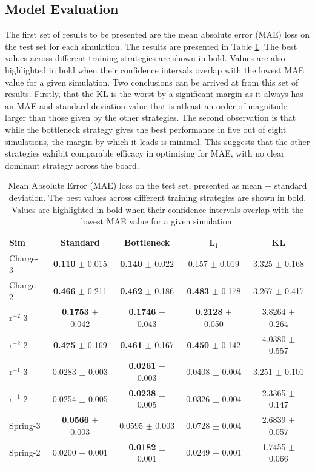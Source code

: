 \documentclass[11pt]{article}
\begin{document}
\subsection{Model Evaluation}
The first set of results to be presented are the mean absolute error (MAE) loss on the test set for each simulation. The results are presented in Table \ref{tab:mae_table_with_std}. The best values across different training strategies are shown in bold. Values are also highlighted in bold when their confidence intervals overlap with the lowest MAE value for a given simulation. Two conclusions can be arrived at from this set of results. Firstly, that the KL is the worst by a significant margin as it always has an MAE and standard deviation value that is atleast an order of magnitude larger than those given by the other strategies. The second observation is that while the bottleneck strategy gives the best performance in five out of eight simulations, the margin by which it leads is minimal. This suggests that the other strategies exhibit comparable efficacy in optimising for MAE, with no clear dominant strategy across the board.
\begin{table}[H]
    \centering
    \begin{tabular}{lcccc}
    \hline
    Sim & Standard & Bottleneck & L$_1$ & KL \\
    \hline
    Charge-3 & \textbf{0.110} $\pm$ 0.015 & \textbf{0.140} $\pm$ 0.022 & 0.157 $\pm$ 0.019 & 3.325 $\pm$ 0.168 \\
    Charge-2 & \textbf{0.466} $\pm$ 0.211 & \textbf{0.462} $\pm$ 0.186 & \textbf{0.483} $\pm$ 0.178 & 3.267 $\pm$ 0.417 \\
    r$^{-2}$-3 & \textbf{0.1753} $\pm$ 0.042 & \textbf{0.1746} $\pm$ 0.043 & \textbf{0.2128} $\pm$ 0.050 & 3.8264 $\pm$ 0.264 \\
    r$^{-2}$-2 & \textbf{0.475} $\pm$ 0.169 & \textbf{0.461} $\pm$ 0.167 & \textbf{0.450} $\pm$ 0.142 & 4.0380 $\pm$ 0.557 \\
    r$^{-1}$-3 & 0.0283 $\pm$ 0.003 & \textbf{0.0261} $\pm$ 0.003 & 0.0408 $\pm$ 0.004 & 3.251 $\pm$ 0.101 \\
    r$^{-1}$-2 & 0.0254 $\pm$ 0.005 & \textbf{0.0238} $\pm$ 0.005 & 0.0326 $\pm$ 0.004 & 2.3365 $\pm$ 0.147 \\
    Spring-3 & \textbf{0.0566} $\pm$ 0.003 & 0.0595 $\pm$ 0.003 & 0.0728 $\pm$ 0.004 & 2.6839 $\pm$ 0.057 \\
    Spring-2 & 0.0200 $\pm$ 0.001 & \textbf{0.0182} $\pm$ 0.001 & 0.0249 $\pm$ 0.001 & 1.7455 $\pm$ 0.066 \\
    \hline
    \end{tabular}
    \caption{Mean Absolute Error (MAE) loss on the test set, presented as mean $\pm$ standard deviation. The best values across different training strategies are shown in bold. Values are highlighted in bold when their confidence intervals overlap with the lowest MAE value for a given simulation.}
    \label{tab:mae_table_with_std}
    \end{table}
\end{document}
